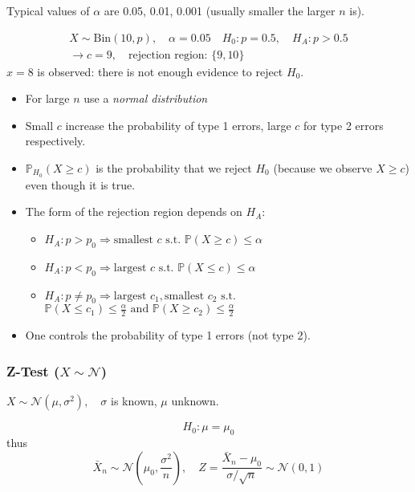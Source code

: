 Typical values of $\alpha$ are 0.05, 0.01, 0.001 (usually smaller the larger $n$ is).

{\color{blue}
    \noindent\begin{gather*}
        X\sim \mathrm{Bin}(10,p),\quad \alpha = 0.05\quad H_0:p=0.5,\quad H_A: p>0.5\\
        \to c=9,\quad \text{rejection region: }\{9,10\}
    \end{gather*}
    $x=8$ is observed: there is not enough evidence to reject $H_0$.
}

\begin{itemize}
    \item For large $n$ use a \textit{normal distribution}
    \item Small $c$ increase the probability of type 1 errors, large $c$ for type 2 errors respectively.
    \item $\mathbb{P}_{H_0}(X\geq c)$ is the probability that we reject $H_0$ (because we observe $X\geq c$) even though it is true.
    \item The form of the rejection region depends on $H_A$:
          \begin{itemize}
              \item $H_A: p>p_0 \Rightarrow \text{smallest }c\text{ s.t. } \mathbb{P}(X\geq c)\leq \alpha$
              \item $H_A: p<p_0 \Rightarrow \text{largest }c\text{ s.t. } \mathbb{P}(X\leq c)\leq \alpha$
              \item $H_A: p\neq p_0 \Rightarrow \text{largest } c_1, \text{smallest }c_2 \text{ s.t.}$\newline
                    $ \mathbb{P}(X\leq c_1)\leq \frac{\alpha}{2} \text{ and }\mathbb{P}(X\geq c_2)\leq \frac{\alpha}{2}$
          \end{itemize}
    \item One controls the probability of type 1 errors (not type 2).
\end{itemize}

\subsubsection[Z-Test]{Z-Test ($X\sim\mathcal{N}$)}
$X\sim\mathcal{N}(\mu,\sigma^2), \quad \sigma$ is known, $\mu$ unknown.

\noindent\begin{equation*}
    H_0:\mu=\mu_0
\end{equation*}
thus
\noindent\begin{equation*}
    \bar{X}_n\sim\mathcal{N}\left(\mu_0,\frac{\sigma^2}n\right), \quad Z=\frac{\bar{X}_n-\mu_0}{\sigma/\sqrt{n}}\sim\mathcal{N}(0,1)
\end{equation*}

